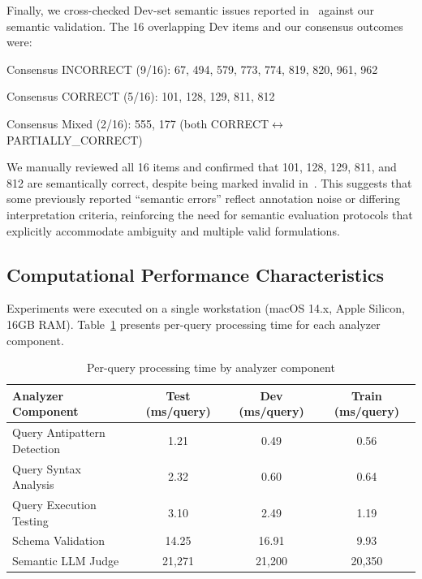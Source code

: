 \documentclass[print]{einformatica}
\begin{document}
Finally, we cross-checked Dev-set semantic issues reported in~\cite{liu2025nl2sqlbugs} against our semantic validation. The 16 overlapping Dev items and our consensus outcomes were:

Consensus INCORRECT (9/16): 67, 494, 579, 773, 774, 819, 820, 961, 962

Consensus CORRECT (5/16): 101, 128, 129, 811, 812

Consensus Mixed (2/16): 555, 177 (both CORRECT$\leftrightarrow$PARTIALLY\_CORRECT)

We manually reviewed all 16 items and confirmed that 101, 128, 129, 811, and 812 are semantically correct, despite being marked invalid in~\cite{liu2025nl2sqlbugs}. This suggests that some previously reported ``semantic errors'' reflect annotation noise or differing interpretation criteria, reinforcing the need for semantic evaluation protocols that explicitly accommodate ambiguity and multiple valid formulations.

\subsection{Computational Performance Characteristics}\label{sec:performance}

Experiments were executed on a single workstation (macOS 14.x, Apple Silicon, 16GB RAM). Table~\ref{tab:performance} presents per-query processing time for each analyzer component.

\begin{table}[ht]
    \caption{Per-query processing time by analyzer component}
    \label{tab:performance}
    \centering
    \footnotesize
    \begin{tabular}{lccc}
        \toprule
        \textbf{Analyzer Component} & \textbf{Test (ms/query)} & \textbf{Dev (ms/query)} & \textbf{Train (ms/query)} \\
        \midrule
        Query Antipattern Detection & 1.21 & 0.49 & 0.56 \\
        Query Syntax Analysis & 2.32 & 0.60 & 0.64 \\
        Query Execution Testing & 3.10 & 2.49 & 1.19 \\
        Schema Validation & 14.25 & 16.91 & 9.93 \\
        Semantic LLM Judge & 21,271 & 21,200 & 20,350 \\
        \bottomrule
    \end{tabular}
\end{table}
\end{document}
